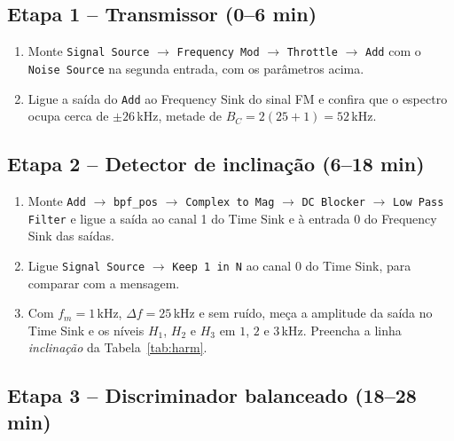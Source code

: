 \documentclass[11pt,a4paper]{article}
\begin{document}
\subsection*{Etapa 1 -- Transmissor (0--6 min)}

\begin{instrucao}
\begin{enumerate}[label=\arabic*.]
  \item Monte \texttt{Signal Source} $\to$ \texttt{Frequency Mod} $\to$
    \texttt{Throttle} $\to$ \texttt{Add} com o \texttt{Noise Source} na segunda
    entrada, com os parâmetros acima.
  \item Ligue a saída do \texttt{Add} ao Frequency Sink do sinal FM e confira
    que o espectro ocupa cerca de $\pm 26$\,kHz, metade de
    $B_C = 2(25 + 1) = 52$\,kHz.
\end{enumerate}
\end{instrucao}

\subsection*{Etapa 2 -- Detector de inclinação (6--18 min)}

\begin{instrucao}
\begin{enumerate}[label=\arabic*.]
  \item Monte \texttt{Add} $\to$ \texttt{bpf\_pos} $\to$ \texttt{Complex to Mag}
    $\to$ \texttt{DC Blocker} $\to$ \texttt{Low Pass Filter} e ligue a saída ao
    canal 1 do Time Sink e à entrada 0 do Frequency Sink das saídas.
  \item Ligue \texttt{Signal Source} $\to$ \texttt{Keep 1 in N} ao canal 0 do
    Time Sink, para comparar com a mensagem.
  \item Com $f_m = 1$\,kHz, $\Delta f = 25$\,kHz e sem ruído, meça a amplitude
    da saída no Time Sink e os níveis $H_1$, $H_2$ e $H_3$ em $1$, $2$ e
    $3$\,kHz. Preencha a linha \textit{inclinação} da Tabela~\ref{tab:harm}.
\end{enumerate}
\end{instrucao}

\subsection*{Etapa 3 -- Discriminador balanceado (18--28 min)}
\end{document}
